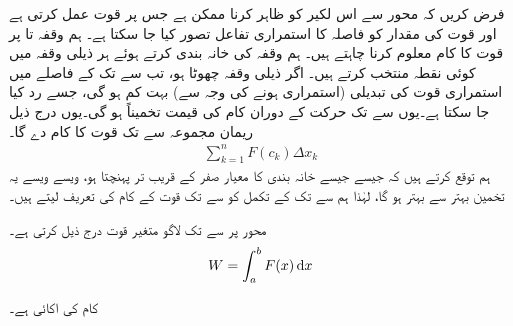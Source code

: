 فرض کریں  کہ محور  سے اس لکیر کو ظاہر کرنا ممکن ہے جس پر قوت عمل کرتی ہے اور قوت کی مقدار  کو  فاصلہ  کا استمراری تفاعل تصور کیا جا سکتا ہے۔ ہم وقفہ  تا  پر قوت کا کام   معلوم کرنا چاہتے ہیں۔  ہم وقفہ  کی خانہ بندی کرتے ہوئے ہر ذیلی وقفہ  میں کوئی نقطہ  منتخب کرتے ہیں۔ اگر ذیلی وقفہ چھوٹا ہو، تب  سے  تک کے  فاصلے میں  استمراری  قوت  کی تبدیلی (استمراری ہونے کی وجہ سے) بہت کم ہو گی،  جسے رد کیا جا سکتا ہے۔یوں  سے  تک حرکت کے دوران کام کی قیمت تخمیناً  ہو گی۔یوں درج ذیل ریمان مجموعہ  سے  تک قوت  کا کام دے گا۔
\begin{align}
\sum_{k=1}^n F(c_k)\Delta x_k
\end{align}
ہم توقع کرتے ہیں کہ  جیسے جیسے خانہ بندی کا معیار صفر کے قریب تر   پہنچتا ہو، ویسے ویسے یہ تخمین  بہتر سے  بہتر ہو گا، لہٰذا ہم  سے  تک  کے تکمل کو  سے  تک قوت  کے کام کی تعریف لیتے ہیں۔ 

محور  پر  سے  تک لاگو متغیر قوت  درج ذیل  کرتی ہے۔
\begin{align}
W=\int_a^bF(x)\dif x
\end{align}

کام کی اکائی   ہے۔

